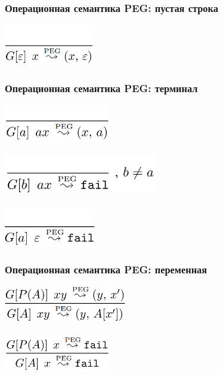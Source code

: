 \documentclass{beamer}
\begin{document}
\begin{frame}[fragile]
  \transwipe[direction=90]
  \frametitle{Операционная семантика PEG: пустая строка}
\begin{center}
  \includegraphics[width=0.3\textwidth]{pics/empty}
\end{center}                                      
\end{frame}

\begin{frame}[fragile]
  \transwipe[direction=90]
  \frametitle{Операционная семантика PEG: терминал}
\begin{center}
  \includegraphics[width=0.35\textwidth]{pics/char1}  \\~\\   \pause
  \includegraphics[width=0.5\textwidth]{pics/char2}   \\~\\   \pause
  \includegraphics[width=0.3\textwidth]{pics/char3}
\end{center}  
\end{frame}

\begin{frame}[fragile]
  \transwipe[direction=90]
  \frametitle{Операционная семантика PEG: переменная}
\begin{center}
  \includegraphics[width=0.4\textwidth]{pics/var1}  \\~\\     \pause
  \includegraphics[width=0.35\textwidth]{pics/var2} 
\end{center}
\end{frame}
\end{document}
